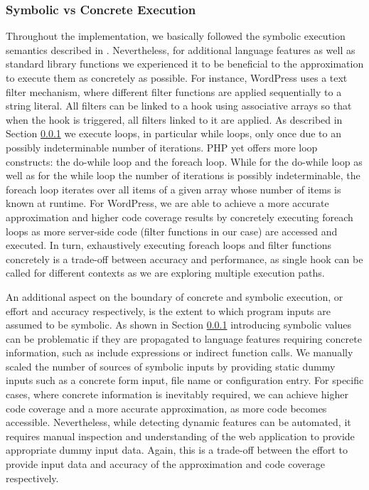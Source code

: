 \documentclass[sigconf]{acmart}
\renewcommand{\sf}[1]{\textsf{#1}}
\begin{document}
\subsubsection{Symbolic vs Concrete Execution}
Throughout the implementation, we basically followed the symbolic execution
semantics described in \cite{Nguyen:2014:BCG:2635868.2635928}. Nevertheless, for additional language features as
well as standard library functions we experienced it to be beneficial to the
approximation to execute them as concretely as possible.
For instance, \sf{WordPress} uses a text filter mechanism, where different
filter functions are applied sequentially to a string literal. All filters can
be linked to a hook using  associative arrays so that when the hook is
triggered, all filters linked to it are applied. As described in Section \ref{}
we execute loops, in particular while loops, only once due to an possibly
indeterminable number of iterations. PHP yet offers more loop constructs: the
do-while loop and the foreach loop. While for the do-while loop as well as for
the while loop the number of iterations is possibly indeterminable, the foreach
loop iterates over all items of a given array whose number of items is known at
runtime. For \sf{WordPress}, we are able to achieve a more accurate
approximation and higher code coverage results by concretely executing foreach
loops as more server-side code (filter functions in our case) are accessed and
executed. In turn, exhaustively executing foreach loops and filter functions
concretely is a trade-off between accuracy and performance, as single hook can
be called for different contexts as we are exploring multiple execution paths.

An additional aspect on the boundary of concrete and symbolic execution, or
effort and accuracy respectively, is the extent to which program inputs are
assumed to be symbolic. As shown in Section \ref{} introducing symbolic values
can be problematic if they are propagated to language features requiring
concrete information, such as include expressions or indirect function calls.
We manually scaled the number of sources of symbolic inputs by providing static
dummy inputs such as a concrete form input, file name or configuration entry.
For specific cases, where concrete information is inevitably required, we can
achieve higher code coverage and a more accurate approximation, as more code
becomes accessible. Nevertheless, while detecting dynamic features can be
automated, it requires manual inspection and understanding of the web
application to provide appropriate dummy input data. Again, this is a trade-off
between the effort to provide input data and accuracy of the approximation and
code coverage respectively.
\end{document}
